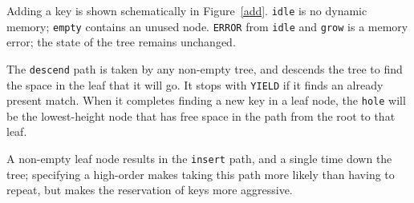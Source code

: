 \documentclass[12pt]{article}
\newcommand{\code}[1]{\colorbox{light-gray}{\texttt{#1}}}
\begin{document}
Adding a key is shown schematically in Figure~\ref{add}. \code{idle} is no dynamic memory; \code{empty} contains an unused node. \code{ERROR} from \code{idle} and \code{grow} is a memory error; the state of the tree remains unchanged.

The \code{descend} path is taken by any non-empty tree, and descends the tree to find the space in the leaf that it will go. It stops with \code{YIELD} if it finds an already present match. When it completes finding a new key in a leaf node, the \code{hole} will be the lowest-height node that has free space in the path from the root to that leaf.

A non-empty leaf node results in the \code{insert} path, and a single time down the tree; specifying a high-order makes taking this path more likely than having to repeat, but makes the reservation of keys more aggressive.
\end{document}
